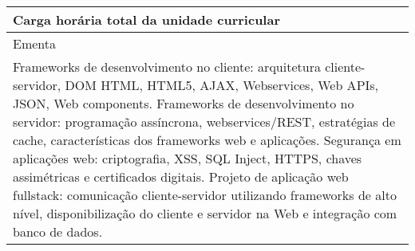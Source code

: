 \begin{quadro}[h!]
\begin{tabular}{|p{3cm} p{2cm} p{3cm} p{2cm} p{3cm} p{2cm}|}
\multicolumn{5}{|p{13cm}|}{\cellcolor{blue1} Carga horária total da unidade curricular} & \multicolumn{1}{p{1cm}|}{\raggedleft 60	}\\\hline
\multicolumn{6}{|p{15cm}|}{\cellcolor{blue1} Ementa} \\\hline
\hline\multicolumn{6}{|p{15cm}|}{\scriptsize Frameworks de desenvolvimento no cliente: arquitetura cliente-servidor, DOM HTML, HTML5, AJAX, Webservices, Web APIs, JSON, Web components. Frameworks de desenvolvimento no servidor: programação assíncrona, webservices/REST, estratégias de cache, características dos frameworks web e aplicações. Segurança em aplicações web: criptografia, XSS, SQL Inject, HTTPS, chaves assimétricas e certificados digitais. Projeto de aplicação web fullstack: comunicação cliente-servidor utilizando frameworks de alto nível, disponibilização do cliente e servidor na Web e integração com banco de dados.}\\\hline
\hline
	\end{tabular}
\end{quadro}
